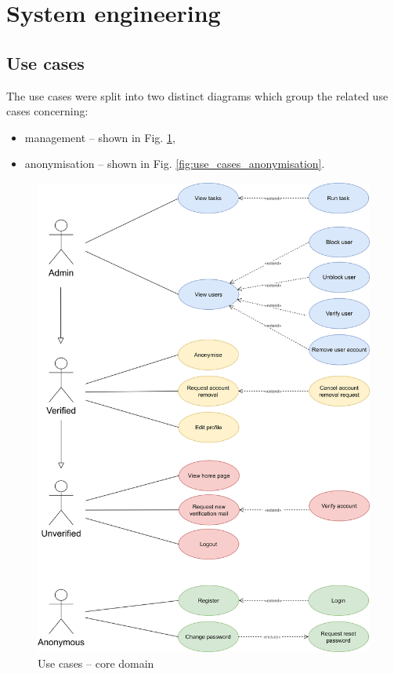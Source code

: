 \documentclass[a4paper,twoside,12pt]{book}
\begin{document}
\section{System engineering}
\subsection{Use cases}

The use cases were split into two distinct diagrams which group the related use cases concerning:
\begin{itemize}
\item management – shown in Fig. \ref{fig:use_cases_management},
\item anonymisation – shown in Fig. \ref{fig:use_cases_anonymisation}. 
\end{itemize}

\begin{figure}
  \centering
  \includegraphics[width=\linewidth]{img/use_cases_core.png}
  \caption{Use cases – core domain}
  \label{fig:use_cases_management}
\end{figure}
\end{document}
